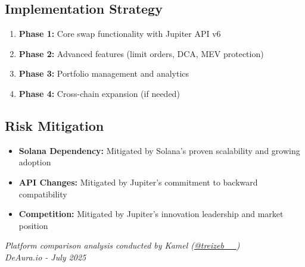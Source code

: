 \documentclass[11pt,a4paper]{article}
\begin{document}
\subsection{Implementation Strategy}

\begin{enumerate}
    \item \textbf{Phase 1:} Core swap functionality with Jupiter API v6
    \item \textbf{Phase 2:} Advanced features (limit orders, DCA, MEV protection)
    \item \textbf{Phase 3:} Portfolio management and analytics
    \item \textbf{Phase 4:} Cross-chain expansion (if needed)
\end{enumerate}

\subsection{Risk Mitigation}

\begin{itemize}
    \item \textbf{Solana Dependency:} Mitigated by Solana's proven scalability and growing adoption
    \item \textbf{API Changes:} Mitigated by Jupiter's commitment to backward compatibility
    \item \textbf{Competition:} Mitigated by Jupiter's innovation leadership and market position
\end{itemize}

\vspace{1cm}

\begin{center}
\textit{Platform comparison analysis conducted by Kamel (\href{https://x.com/treizeb__}{@treizeb\_\_})\\
DeAura.io - July 2025}
\end{center}
\end{document}
